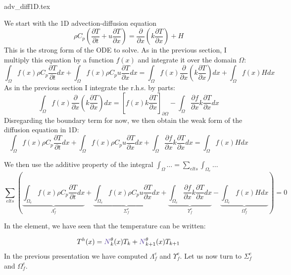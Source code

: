 \begin{flushright} {\tiny {\color{gray} adv\_diff1D.tex}} \end{flushright}

We start with the 1D advection-diffusion equation
\begin{equation}
\rho C_p \left( \frac{\partial T}{\partial t} 
+ u \frac{\partial T}{\partial x}
\right)
= \frac{\partial }{\partial x} \left( k \frac{\partial T}{\partial x}  \right)
+H
\end{equation}
This is the {\color{olive}strong form} of the ODE to solve.
As in the previous section, I multiply this equation by a function $f(x)$ and integrate it over 
the domain $\Omega$:
\[
\int_{\Omega} f(x)  \rho C_p\frac{\partial T}{\partial t} dx
+
\int_{\Omega} f(x)  \rho C_p u \frac{\partial T}{\partial x} dx
\!=\!
\int_{\Omega} f(x) \frac{\partial }{\partial x}\! \left(\! k\! \frac{\partial T}{\partial x}\!  \right)\! dx
+
\int_{\Omega} f(x) H dx 
\]
As in the previous section I integrate the r.h.s. by parts:
\[
\int_{\Omega} f(x) \frac{\partial }{\partial x} \left( k \frac{\partial T}{\partial x}  \right) dx
=
\left[
f(x) k \frac{\partial T}{\partial x}
\right]_{\partial \Omega}
-
\int_{\Omega} \frac{\partial f}{\partial x}  k \frac{\partial T}{\partial x}  dx
\]
Disregarding the boundary term for now, 
we then obtain the {\color{olive}weak form} of the diffusion equation in 1D:
\[
\boxed{
\int_{\Omega} f(x) \rho C_p \frac{\partial T}{\partial t} dx
+
\int_{\Omega} f(x)  \rho C_p u \frac{\partial T}{\partial x} dx
+
\int_{\Omega} \frac{\partial f}{\partial x}  k \frac{\partial T}{\partial x}  dx = 
\int_{\Omega} f(x) H dx 
}
\]

We then use the additive property of the integral $\int_\Omega \dots = \sum_{elts} \int_{\Omega_e} \dots$
\[
\sum_{elts} \left(     
\underbrace{ \int_{\Omega_e} f(x) \rho C_p   \frac{\partial T}{\partial t} dx }_{{\Lambda}_f^e}
+
\underbrace{  \int_{\Omega_e} f(x)  \rho C_p u \frac{\partial T}{\partial x} dx  }_{{\Sigma}_f^e}
+
\underbrace{\int_{\Omega_e} \frac{\partial f}{\partial x}  k \frac{\partial T}{\partial x}  dx}_{{\Upsilon}_f^e}    
- 
\underbrace{\int_{\Omega_e} f(x) H dx }_{{\Omega}_f^e}
  \right) = 0  
\]

In the element, we have seen that the temperature can be written:

\[
T^h(x) 
= {\color{Violet}N}^\theta_{k}(x) T_k + {\color{Violet}N}^\theta_{k+1}(x) T_{k+1}  
\]
In the previous presentation we have computed  ${\Lambda}_f^e$ and ${\Upsilon}_f^e$.
Let us now turn to ${\Sigma}_f^e$ and ${\Omega}_f^e$.

